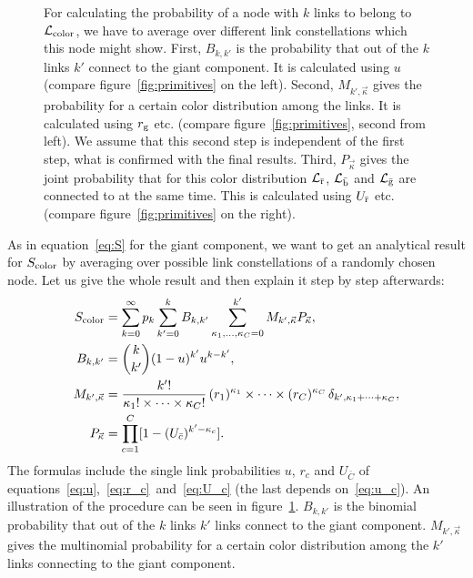 \documentclass[aps, pre, onecolumn, a4paper, floatfix]{revtex4}
\begin{document}
\begin{figure}[htb]
\begin{minipage}[b]{0.54\linewidth}
  \end{minipage}
    \caption{For calculating the probability of a node with $k$ links to belong to 
    $\mathcal{L}_{\rm color}$, we have to average over different link constellations which this node 
    might show. First, $B_{k,k'}$ is the probability that out of the $k$ links $k'$ 
    connect to the giant component. It is calculated using $u$ (compare figure~\ref{fig:primitives} 
    on the left). Second, $M_{k',\vec{\kappa}}$ gives the probability for a certain color 
    distribution among the links. It is calculated using $r_{\rm g}$ etc. (compare 
    figure~\ref{fig:primitives}, second from left). We assume that this second step is 
    independent of the first step, what is confirmed with the final results. Third, 
    $P_{\vec \kappa}$ gives the joint probability that for this color distribution 
    $\mathcal{L}_{\bar{\rm r}}$, $\mathcal{L}_{\bar{\rm b}}$ and $\mathcal{L}_{\bar{\rm g}}$ are connected to at 
    the same time. This is calculated using $U_{\bar{\rm r}}$ etc. (compare 
    figure~\ref{fig:primitives} on the right).}
    \label{fig:stepwise}
\end{figure}
As in equation~\ref{eq:S} for the giant component, 
we want to get an analytical result for $S_{\rm color}$ 
by averaging over possible link constellations of a randomly chosen node. 
Let us give the whole result and then explain it step by step afterwards:
\begin{align}
S_{\rm color} &= \sum_{k=0}^{\infty}p_k \sum_{k'=0}^{k} B_{k,k'} 
\sum_{\kappa_1,\dots, \kappa_C=0}^{k'} M_{k',\vec \kappa} 
P_{\vec \kappa},\label{eq:S_color}\\
B_{k,k'} &={k \choose k'}(1-u)^{k'}u^{k-k'},\label{eq:B}\\
M_{k',\vec \kappa} &=\frac{k'!}{\kappa_1! \times \dots \times \kappa_C!} \,
(r_1)^{\kappa_1} \times \dots \times (r_C)^{\kappa_C}\,
\delta_{k',\kappa_1+\dots + \kappa_C},\\
P_{\vec \kappa} &= \prod_{c=1}^C [1-(U_{\bar c})^{k'- \kappa_c }].\label{eq:p_success}
\end{align}
The formulas include the single link probabilities $u$, $r_c$ and $U_{\bar C}$ 
of equations~\eqref{eq:u},~\eqref{eq:r_c}~and~\eqref{eq:U_c} (the last depends on~\eqref{eq:u_c}). 
An illustration of the procedure can be seen in figure~\ref{fig:stepwise}.
$B_{k,k'}$ is the binomial probability that out of the $k$ links $k'$ links connect to the giant component. 
$M_{k',\vec{\kappa}}$ gives the multinomial probability 
for a certain color distribution among the $k'$ links connecting to the giant component.
\end{document}
